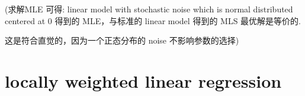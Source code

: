 \documentclass[lang=cn,11pt]{elegantbook}
\begin{document}
(求解MLE 可得: linear model with stochastic noise which is normal
distributed centered at 0 得到的 MLE，与标准的 linear model 得到的 MLS
最优解是等价的.

这是符合直觉的，因为一个正态分布的 noise 不影响参数的选择)


\hypertarget{locally-weighted-linear-regression}{%
\section{\texorpdfstring{locally weighted linear regression
}{locally weighted linear regression }}\label{locally-weighted-linear-regression}}

\end{document}

